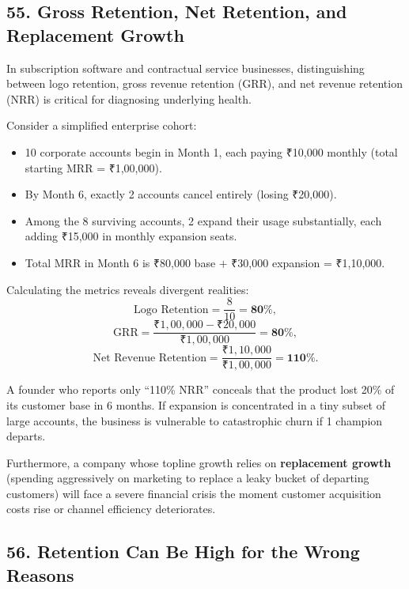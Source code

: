 \subsection*{55. Gross Retention, Net Retention, and Replacement Growth}

In subscription software and contractual service businesses, distinguishing between logo retention, gross revenue retention (GRR), and net revenue retention (NRR) is critical for diagnosing underlying health.

Consider a simplified enterprise cohort:
\begin{itemize}
    \item 10 corporate accounts begin in Month 1, each paying ₹10,000 monthly (total starting MRR = ₹1,00,000).
    \item By Month 6, exactly 2 accounts cancel entirely (losing ₹20,000).
    \item Among the 8 surviving accounts, 2 expand their usage substantially, each adding ₹15,000 in monthly expansion seats.
    \item Total MRR in Month 6 is ₹80,000 base $+$ ₹30,000 expansion = ₹1,10,000.
\end{itemize}

Calculating the metrics reveals divergent realities:
\begin{equation}
\text{Logo Retention} = \frac{8}{10} = \mathbf{80\%},
\end{equation}
\begin{equation}
\text{GRR} = \frac{₹1,00,000 - ₹20,000}{₹1,00,000} = \mathbf{80\%},
\end{equation}
\begin{equation}
\text{Net Revenue Retention} = \frac{₹1,10,000}{₹1,00,000} = \mathbf{110\%}.
\end{equation}

A founder who reports only ``110\% NRR'' conceals that the product lost 20\% of its customer base in 6 months. If expansion is concentrated in a tiny subset of large accounts, the business is vulnerable to catastrophic churn if 1 champion departs.

Furthermore, a company whose topline growth relies on \textbf{replacement growth} (spending aggressively on marketing to replace a leaky bucket of departing customers) will face a severe financial crisis the moment customer acquisition costs rise or channel efficiency deteriorates.

\subsection*{56. Retention Can Be High for the Wrong Reasons}

